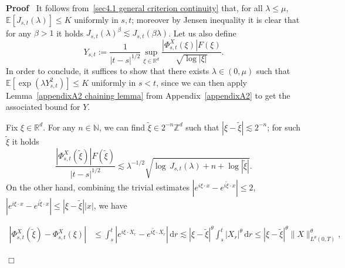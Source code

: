 \documentclass[10pt]{article}
\newcommand{\assign}{:=}
\newcommand{\mathd}{\mathrm{d}}
\newenvironment{proof}{\noindent\textbf{Proof\ }}{\hspace*{\fill}$\Box$\medskip}
\begin{document}
\begin{proof}
  It follows from~{\eqref{sec4.1 general criterion continuity}} that, for all
  $\lambda \leqslant \mu$, $\mathbb{E} [J_{s, t} (\lambda)] \leqslant K$
  uniformly in $s, t$; moreover by Jensen inequality it is clear that for any
  $\beta > 1$ it holds $J_{s, t} (\lambda)^{\beta} \lesssim J_{s, t} (\beta
  \lambda)$. Let us also define
  \[ Y_{s, t} \assign \frac{1}{| t - s |^{1 / 2}} \sup_{\xi \in \mathbb{R}^d}
     \frac{| \Phi^X_{s, t} (\xi) | F (\xi)}{\sqrt{\log | \xi |}} . \]
  In order to conclude, it suffices to show that there exists $\lambda \in (0,
  \mu)$ such that $\mathbb{E} [\exp (\lambda Y^2_{s, t})] \leqslant K$
  uniformly in $s < t$, since we can then apply Lemma~\ref{appendixA2 chaining
  lemma} from Appendix~\ref{appendixA2} to get the associated bound for $Y$.
  
  Fix $\xi \in \mathbb{R}^d$. For any $n \in \mathbb{N}$, we can find
  $\tilde{\xi} \in 2^{- n} \mathbb{Z}^d$ such that $| \xi - \tilde{\xi} |
  \lesssim 2^{- n}$; for such $\tilde{\xi}$ it holds
  \[ \frac{| \Phi_{s, t}^X (\tilde{\xi}) | F (\tilde{\xi})}{| t - s |^{1 / 2}}
     \lesssim \lambda^{- 1 / 2} \sqrt{\log \, J_{s, t} (\lambda) + n + \log |
     \tilde{\xi} |} . \]
  On the other hand, combining the trivial estimates $| e^{i \xi \cdot x} -
  e^{i \tilde{\xi} \cdot x} | \leqslant 2$, $| e^{i \xi \cdot x} - e^{i
  \tilde{\xi} \cdot x} | \leqslant | \xi - \tilde{\xi} | | x |$, we have
  
  \begin{align}
    | \Phi_{s, t}^X (\tilde{\xi}) - \Phi_{s, t}^X (\xi) | & \leqslant \int_s^t
    | e^{i \xi \cdot X_r} - e^{i \tilde{\xi} \cdot X_r} | \, \mathd r \lesssim
    | \xi - \tilde{\xi} |^{\theta} \int_s^t | X_r |^{\theta} \, \mathd r
    \leqslant | \xi - \tilde{\xi} |^{\theta} \| X \|_{L^{\theta} (0,
    T)}^{\theta},
  \end{align}
  

\end{proof}
\end{document}
